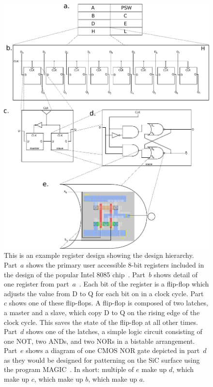 \documentclass[12pt]{amsart}
\begin{document}
 	 	\begin{figure}[htbp] %
 	 	   \centering
 	 	   \includegraphics[width=.8\columnwidth]{register.pdf} 
 	 	   \caption{This is an example register design showing the design hierarchy.  Part~$a$ shows the primary user accessible 8-bit registers included in the design of the popular Intel 8085 chip~\cite{intel_corporation_8080/8085_1978}.  Part~$b$ shows detail of one register from part~$a$~\cite{harris_digital_2012,patterson_computer_2013}.  Each bit of the register is a flip-flop which adjusts the value from D to Q for each bit on in a clock cycle.  Part~$c$ shows one of these flip-flops.  A flip-flop is composed of two latches, a master and a slave, which copy D to Q on the rising edge of the clock cycle.  This saves the state of the flip-flop at all other times.  Part~$d$ shows one of the latches, a simple logic circuit consisting of one NOT, two ANDs, and two NORs in a bistable arrangement.  Part~$e$ shows a diagram of one CMOS NOR gate depicted in part~$d$ as they would be designed for patterning on the SiC surface using the program MAGIC~\cite{ousterhout1985magic}.  In short: multiple of $e$ make up $d$, which make up $c$, which make up $b$, which make up $a$.}
 	 	   \label{fig:register}
 	 	\end{figure}
 	 	
\end{document}
